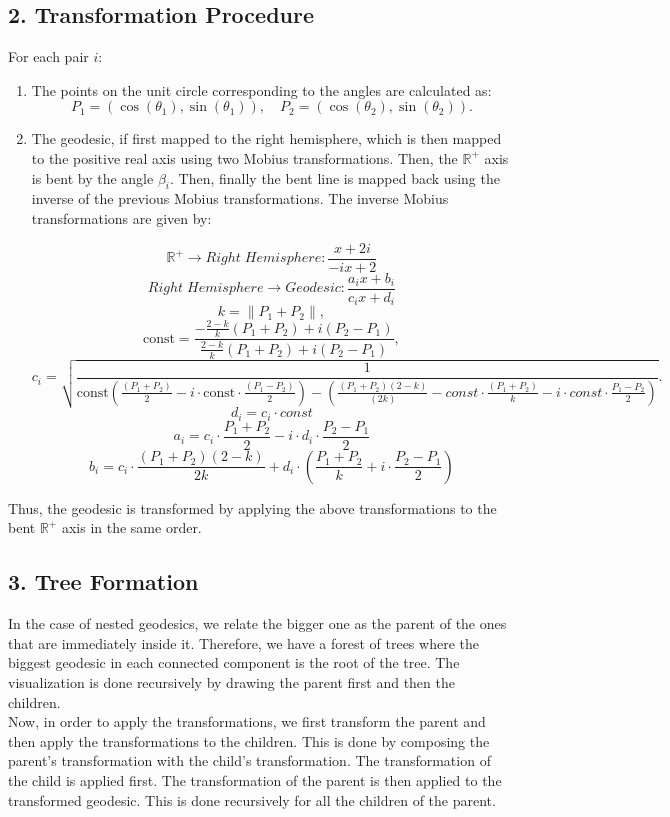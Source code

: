 \documentclass[a4paper,12pt]{article}
\begin{document}
\subsection*{2. Transformation Procedure}
For each pair \( i \):
\begin{enumerate}
    \item The points on the unit circle corresponding to the angles are calculated as:
    \[
    P_1 = (\cos(\theta_1), \sin(\theta_1)), \quad P_2 = (\cos(\theta_2), \sin(\theta_2)).
    \]

    \item The geodesic, if first mapped to the right hemisphere, which is then mapped to the positive real axis using two Mobius transformations.
    Then, the $\mathbb{R}^+$ axis is bent by the angle $\beta_i$. Then, finally the bent line is mapped back using the inverse of the previous Mobius transformations.
    The inverse Mobius transformations are given by:


    $$\mathbb{R}^+ \to Right\;Hemisphere: \frac{x+2i}{-ix+2}$$
    $$Right\;Hemisphere \to Geodesic: \frac{a_ix+b_i}{c_ix+d_i}$$
    $$k = \|P_1 + P_2\|, $$
    $$\text{const} = \frac{-\frac{2-k}{k}(P_1 + P_2) + i(P_2 - P_1)}{\frac{2-k}{k}(P_1 + P_2) + i(P_2 - P_1)},$$
    $$c_i = \sqrt{\frac{1}{\text{const}(\frac{(P_1 + P_2)}{2} - i \cdot \text{const} \cdot \frac{(P_1 - P_2)}{2}) - (\frac{(P_1+P_2)(2-k)}{(2k)}-const\cdot\frac{(P_1+P_2)}{k}-i\cdot const\cdot\frac{P_1-P_2}{2})}}.$$
    $$d_i = c_i\cdot const$$
    $$a_i = c_i\cdot \frac{P_1+P_2}{2}-i\cdot d_i\cdot \frac{P_2-P_1}{2}$$
    $$b_i = c_i\cdot \frac{(P_1+P_2)(2-k)}{2k}+d_i\cdot\left( \frac{P_1+P_2}{k} + i\cdot\frac{P_2-P_1}{2}\right)$$
    
\end{enumerate}
Thus, the geodesic is transformed by applying the above transformations to the bent $\mathbb{R}^+$ axis in the same order.

\subsection*{3. Tree Formation}
In the case of nested geodesics, we relate the bigger one as the parent of the ones that are immediately inside it. Therefore, we have a forest
of trees where the biggest geodesic in each connected component is the root of the tree. The visualization is done recursively by drawing the parent first and then the children.\\

Now, in order to apply the transformations, we first transform the parent and then apply the transformations to the children. This is done by composing the parent's transformation with the child's transformation. The transformation of the child is applied first. The transformation of the parent is then applied to the transformed geodesic. This is done recursively for all the children of the parent.
\end{document}
